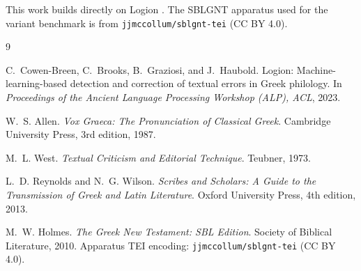 \documentclass[11pt]{article}
\begin{document}
This work builds directly on Logion \cite{logion2023}. The SBLGNT apparatus used
for the variant benchmark is from \texttt{jjmccollum/sblgnt-tei} (CC BY 4.0).

\begin{thebibliography}{9}
\footnotesize

C.~Cowen-Breen, C.~Brooks, B.~Graziosi, and J.~Haubold.
\newblock Logion: Machine-learning-based detection and correction of textual
errors in Greek philology.
\newblock In \emph{Proceedings of the Ancient Language Processing Workshop (ALP),
ACL}, 2023.

W.~S. Allen.
\newblock \emph{Vox Graeca: The Pronunciation of Classical Greek}.
\newblock Cambridge University Press, 3rd edition, 1987.

M.~L. West.
\newblock \emph{Textual Criticism and Editorial Technique}.
\newblock Teubner, 1973.

L.~D. Reynolds and N.~G. Wilson.
\newblock \emph{Scribes and Scholars: A Guide to the Transmission of Greek and
Latin Literature}.
\newblock Oxford University Press, 4th edition, 2013.

M.~W. Holmes.
\newblock \emph{The Greek New Testament: SBL Edition}.
\newblock Society of Biblical Literature, 2010.
\newblock Apparatus TEI encoding: \texttt{jjmccollum/sblgnt-tei} (CC BY 4.0).

\end{thebibliography}
\end{document}

